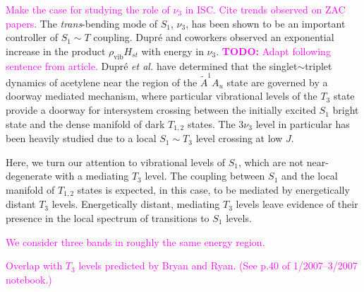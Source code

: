 \documentclass[12pt,draft]{mitthesis}
\newcommand{\TODO} [1]{\textcolor{magenta}{\textbf{TODO:} #1}}
\newcommand{\POINT}[1]{\textcolor{magenta}{#1}}
\begin{document}
\POINT{Make the case for studying the role of $\nu_3$ in ISC.  Cite
  trends observed on ZAC papers. }  The \emph{trans}-bending mode of
$S_1$, $\nu_3$, has been shown to be an important controller of $S_1
\sim T$ coupling.  Dupr\'{e} and coworkers observed an exponential
increase in the product $\rho_{\text{vib}} H_{st}$ with energy in
$\nu_3$.  \TODO{Adapt following sentence from article.} Dupr\'{e}
\emph{et al.} have determined that the singlet$\sim$triplet dynamics
of acetylene near the region of the $\tilde{A} ^1A_u$ state are
governed by a doorway mediated mechanism, where particular vibrational
levels of the $T_3$ state provide a doorway for intersystem crossing
between the initially excited $S_1$ bright state and the dense
manifold of dark $T_{1,2}$ states.  The $3 \nu_3$ level in particular
has been heavily studied due to a local $S_1 \sim T_3$ level crossing
at low $J$.

Here, we turn our attention to vibrational levels of $S_1$,
which are not near-degenerate with a mediating $T_3$ level.  The
coupling between $S_1$ and the local manifold of $T_{1,2}$ states is
expected, in this case, to be mediated by energetically distant $T_3$
levels.  Energetically distant, mediating $T_3$ levels leave evidence
of their presence in the local spectrum of transitions to $S_1$
levels.

\POINT{ We consider three bands in roughly the same energy region.}

\POINT{Overlap with $T_3$ levels predicted by Bryan and Ryan.  (See
  p.40 of 1/2007--3/2007 notebook.)}
\end{document}
